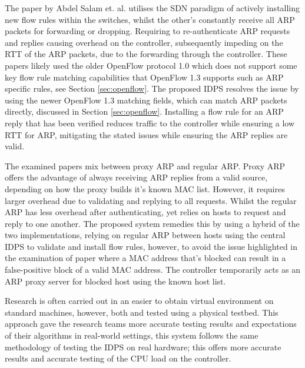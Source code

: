 \documentclass[12pt, oneside]{book}
\begin{document}
The paper by Abdel Salam et. al. \cite{abdelsalam2015mitigating} utilises the SDN paradigm of actively installing
new flow rules within the switches,
whilst the other's constantly receive all ARP packets for forwarding or dropping. Requiring to re-authenticate
ARP requests and replies causing overhead on the controller, subsequently impeding on the RTT of the ARP packets, due to the forwarding 
through the controller. These papers likely used the older OpenFlow protocol 1.0 which does not support some key flow rule matching
capabilities that OpenFlow 1.3 supports such as ARP specific rules, see Section \ref{sec:openflow}.
The proposed IDPS resolves the issue by using the newer OpenFlow 1.3 matching fields, which can match ARP packets directly,
discussed in Section \ref{sec:openflow}. Installing
a flow rule for an ARP reply that has been verified reduces traffic to the controller while ensuring a low RTT for ARP,
mitigating the stated issues while ensuring the ARP replies are valid.\newline

The examined papers mix between proxy ARP \cite{alharbi2016securing}\cite{matties2017distributed} and
regular ARP\cite{masoud2015preventing}\cite{abdelsalam2015mitigating}. Proxy ARP offers the advantage of always receiving
ARP replies from a valid source, depending on how the proxy builds it's known MAC list. However, it requires larger overhead due to
validating and
replying to all requests. Whilst the regular ARP has less overhead after authenticating, yet relies on hosts to request and reply
to one another. The proposed system remedies this by using a hybrid of the two implementations, relying on regular ARP between hosts
using the central
IDPS to validate and install flow rules, however, to avoid the issue highlighted in the examination of paper
\cite{abdelsalam2015mitigating}
where a MAC address that's blocked can result in a false-positive block of a valid MAC address. The controller
temporarily acts as an ARP proxy server for blocked host using the known host list. \newline

Research is often carried out in an easier to obtain virtual environment on standard machines,
however, both \cite{alharbi2016securing} and \cite{masoud2015preventing} tested using a physical testbed. This approach
gave the research teams more accurate testing results and expectations of their algorithms in real-world settings,
this system follows the same methodology of testing the IDPS on real hardware; this offers more accurate results and 
accurate testing of the CPU load on the controller.
\end{document}
